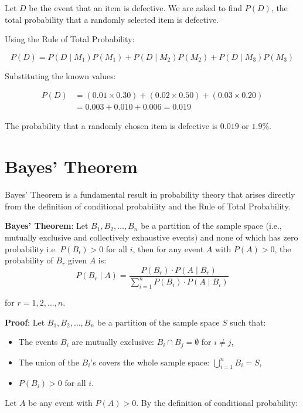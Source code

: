 \documentclass[twoside]{book}
\begin{document}
Let \( D \) be the event that an item is defective. We are asked to find \( P(D) \), the total probability that a randomly selected item is defective.

Using the Rule of Total Probability:

\[
P(D) = P(D \mid M_1)P(M_1) + P(D \mid M_2)P(M_2) + P(D \mid M_3)P(M_3)
\]

Substituting the known values:

\begin{align*}
    P(D) &= (0.01 \times 0.30) + (0.02 \times 0.50) + (0.03 \times 0.20) \\
    &= 0.003 + 0.010 + 0.006 = 0.019
\end{align*}

The probability that a randomly chosen item is defective is $0.019$ or $1.9$\%.


\section{Bayes' Theorem}
Bayes' Theorem is a fundamental result in probability theory that arises directly from the definition of conditional probability and the Rule of Total Probability.
\begin{textbox}
    \textbf{Bayes' Theorem}: Let \( B_1, B_2, \ldots, B_n \) be a partition of the sample space (i.e., mutually exclusive and collectively exhaustive events) and none of which has zero probability i.e. \( P(B_i) > 0 \) for all \( i \), then for any event \( A \) with \( P(A) > 0 \), the probability of \( B_r \) given \( A \) is:
\[
P(B_r \mid A) = \frac{P(B_r) \cdot P(A \mid B_r)}{\sum_{i=1}^{n} P(B_i) \cdot P(A \mid B_i)}
\]

for \( r = 1, 2, \ldots, n \).
\end{textbox}
\textbf{Proof}: Let \( B_1, B_2, \ldots, B_n \) be a partition of the sample space \( S \) such that:
\begin{itemize}
    \item The events \( B_i \) are mutually exclusive: \( B_i \cap B_j = \emptyset \) for \( i \neq j \),
    \item The union of the \( B_i \)'s covers the whole sample space: \( \bigcup_{i=1}^n B_i = S \),
    \item \( P(B_i) > 0 \) for all \( i \).
\end{itemize}

Let \( A \) be any event with \( P(A) > 0 \). By the definition of conditional probability:
\end{document}
